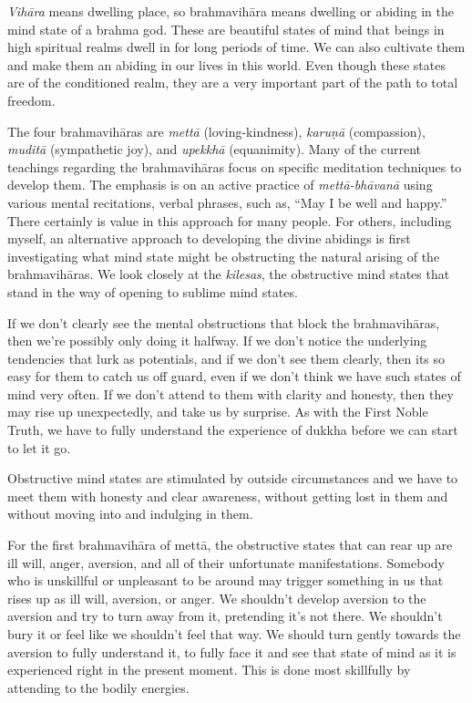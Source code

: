 \emph{Vihāra} means dwelling place, so brahmavihāra means dwelling or abiding in the mind state of a brahma god. These are beautiful states of mind that beings in high spiritual realms dwell in for long periods of time. We can also cultivate them and make them an abiding in our lives in this world. Even though these states are of the conditioned realm, they are a very important part of the path to total freedom.~

The four brahmavihāras are \emph{mettā} (loving-kindness), \emph{karuṇā} (compassion), \emph{muditā} (sympathetic joy), and \emph{upekkhā} (equanimity). Many of the current teachings regarding the brahmavihāras focus on specific meditation techniques to develop them. The emphasis is on an active practice of \emph{mettā-bhāvanā} using various mental recitations, verbal phrases, such as, ``May I be well and happy.'' There certainly is value in this approach for many people. For others, including myself, an alternative approach to developing the divine abidings is first investigating what mind state might be obstructing the natural arising of the brahmavihāras. We look closely at the \emph{kilesas}, the obstructive mind states that stand in the way of opening to sublime mind states.~

If we don't clearly see the mental obstructions that block the brahmavihāras, then we're possibly only doing it halfway. If we don't notice the underlying tendencies that lurk as potentials, and if we don't see them clearly, then it\textquotesingle s so easy for them to catch us off guard, even if we don't think we have such states of mind very often. If we don't attend to them with clarity and honesty, then they may rise up unexpectedly, and take us by surprise. As with the First Noble Truth, we have to fully understand the experience of dukkha before we can start to let it go.

Obstructive mind states are stimulated by outside circumstances and we have to meet them with honesty and clear awareness, without getting lost in them and without moving into and indulging in them.

For the first brahmavihāra of mettā, the obstructive states that can rear up are ill will, anger, aversion, and all of their unfortunate manifestations. Somebody who is unskillful or unpleasant to be around may trigger something in us that rises up as ill will, aversion, or anger. We shouldn't develop aversion to the aversion and try to turn away from it, pretending it's not there. We shouldn't bury it or feel like we shouldn't feel that way. We should turn gently towards the aversion to fully understand it, to fully face it and see that state of mind as it is experienced right in the present moment. This is done most skillfully by attending to the bodily energies.


